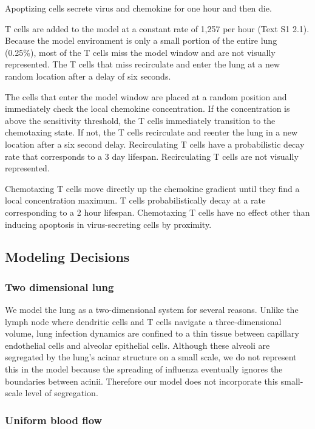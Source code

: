 \documentclass[10pt]{article}
\begin{document}
Apoptizing cells secrete virus and chemokine for one hour and then die.

T cells are added to the model at a constant rate of 1,257 per hour (Text S1 2.1).  Because the model environment is only a small portion of the entire lung (0.25\%), most of the T cells miss the model window and are not visually represented.  The T cells that miss recirculate and enter the lung at a new random location after a delay of six seconds.

The cells that enter the model window are placed at a random position and immediately check the local chemokine concentration.  If the concentration is above the sensitivity threshold, the T cells immediately transition to the chemotaxing state.  If not, the T cells recirculate and reenter the lung in a new location after a six second delay.  Recirculating T cells have a probabilistic decay rate that corresponds to a 3 day lifespan.  Recirculating T cells are not visually represented.  

Chemotaxing T cells move directly up the chemokine gradient until they find a local concentration maximum.  T cells probabilistically decay at a rate corresponding to a 2 hour lifespan.  Chemotaxing T cells have no effect other than inducing apoptosis in virus-secreting cells by proximity.


\subsection{Modeling Decisions}

\subsubsection{Two dimensional lung}

We model the lung as a two-dimensional system for several reasons.  Unlike the lymph node where dendritic cells and T cells navigate a three-dimensional volume, lung infection dynamics are confined to a thin tissue between capillary endothelial cells and alveolar epithelial cells.  Although these alveoli are segregated by the lung's acinar structure on a small scale, we do not represent this in the model because the spreading of influenza eventually ignores the boundaries between acinii.  Therefore our model does not incorporate this small-scale level of segregation. 

\subsubsection{Uniform blood flow}
\end{document}
